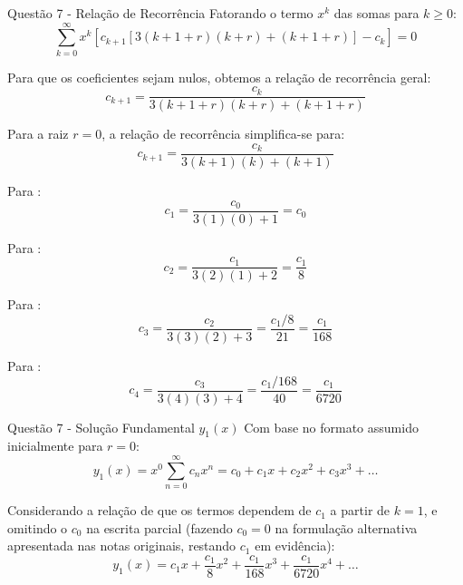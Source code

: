 \documentclass[8pt,aspectratio = 169]{beamer}
\begin{document}
\begin{frame}{Questão 7 - Relação de Recorrência}
    Fatorando o termo $x^k$ das somas para $k \ge 0$:
    \begin{equation*}
        \sum_{k=0}^{\infty} x^k \left[ c_{k+1} \left[ 3(k+1+r)(k+r) + (k+1+r) \right] - c_k \right] = 0
    \end{equation*}
    
    Para que os coeficientes sejam nulos, obtemos a relação de recorrência geral:
    \begin{equation*}
        c_{k+1} = \frac{c_k}{3(k+1+r)(k+r) + (k+1+r)}
    \end{equation*}
\end{frame}

\begin{frame}
    Para a raiz $r=0$, a relação de recorrência simplifica-se para:
    \begin{equation*}
        c_{k+1} = \frac{c_k}{3(k+1)(k) + (k+1)}
    \end{equation*}
    
    \vspace{0.3cm}
    Para : 
    \begin{equation*}
        c_1 = \frac{c_0}{3(1)(0) + 1} = c_0
    \end{equation*}
    
    Para : 
    \begin{equation*}
        c_2 = \frac{c_1}{3(2)(1) + 2} = \frac{c_1}{8}
    \end{equation*}
    
    Para : 
    \begin{equation*}
        c_3 = \frac{c_2}{3(3)(2) + 3} = \frac{c_1/8}{21} = \frac{c_1}{168}
    \end{equation*}
    
    Para : 
    \begin{equation*}
        c_4 = \frac{c_3}{3(4)(3) + 4} = \frac{c_1/168}{40} = \frac{c_1}{6720}
    \end{equation*}
\end{frame}

\begin{frame}{Questão 7 - Solução Fundamental $y_1(x)$}
    Com base no formato assumido inicialmente para $r=0$:
    \begin{equation*}
        y_1(x) = x^0 \sum_{n=0}^{\infty} c_n x^n = c_0 + c_1 x + c_2 x^2 + c_3 x^3 + \dots
    \end{equation*}
    
    Considerando a relação de que os termos dependem de $c_1$ a partir de $k=1$, e omitindo o $c_0$ na escrita parcial (fazendo $c_0=0$ na formulação alternativa apresentada nas notas originais, restando $c_1$ em evidência):
    \begin{equation*}
        y_1(x) = c_1 x + \frac{c_1}{8} x^2 + \frac{c_1}{168} x^3 + \frac{c_1}{6720} x^4 + \dots
    \end{equation*}
\end{frame}
  
\end{document}
